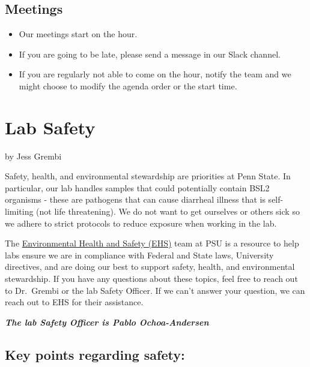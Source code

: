 \documentclass[
]{book}
\providecommand{\tightlist}{%
  \setlength{\itemsep}{0pt}\setlength{\parskip}{0pt}}
\begin{document}
\section{Meetings}\label{meetings}

\begin{itemize}
\tightlist
\item
  Our meetings start on the hour.
\item
  If you are going to be late, please send a message in our Slack channel.
\item
  If you are regularly not able to come on the hour, notify the team and we might choose to modify the agenda order or the start time.
\end{itemize}

\chapter{Lab Safety}\label{lab-safety}

by Jess Grembi

Safety, health, and environmental stewardship are priorities at Penn State. In particular, our lab handles samples that could potentially contain BSL2 organisms - these are pathogens that can cause diarrheal illness that is self-limiting (not life threatening). We do not want to get ourselves or others sick so we adhere to strict protocols to reduce exposure when working in the lab.

The \href{https://ehs.psu.edu/}{Environmental Health and Safety (EHS)} team at PSU is a resource to help labs ensure we are in compliance with Federal and State laws, University directives, and are doing our best to support safety, health, and environmental stewardship. If you have any questions about these topics, feel free to reach out to Dr.~Grembi or the lab Safety Officer. If we can't answer your question, we can reach out to EHS for their assistance.

\textbf{\emph{The lab Safety Officer is Pablo Ochoa-Andersen}}

\section{Key points regarding safety:}\label{key-points-regarding-safety}
\end{document}
